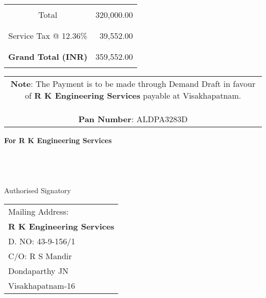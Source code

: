 \documentclass[11pt]{article}
\begin{document}

\hspace*{12.2cm}
\begin{tabular}{|c|r|}
\hline
& \\
Total & 320,000.00 \\
& \\
\hline
& \\
Service Tax @ 12.36\% & 39,552.00 \\
& \\
\hline
& \\
{\bf Grand Total (INR)} & 359,552.00 \\
& \\
\hline
\end{tabular}

\vspace*{-2.25cm}
\noindent \begin{tabular}{c}
\parbox{4in}{ {\bf Note}: The Payment is to be made through Demand Draft in favour of {\bf R K Engineering Services} payable at Visakhapatnam. \\ \\
{\noindent \bf Pan Number}:  ALDPA3283D }\\
\end{tabular}
\vspace*{85pt}


{\bf For  R K Engineering Services } \\ \\ \\ \\ \\
 \hspace*{0.6cm}Authorised Signatory
\vspace*{-72pt}
\begin{flushright}
\begin{tabular}{l}
Mailing Address:\\
{\bf R K Engineering Services}\\
D. NO: 43-9-156/1\\
C/O: R S Mandir\\
Dondaparthy JN\\ 
Visakhapatnam-16\\
\end{tabular}
\end{flushright}
\end{document}
